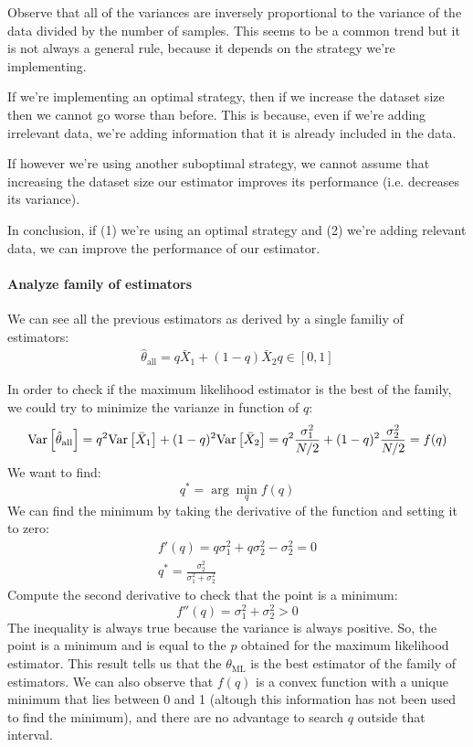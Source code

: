\begin{remark}
    Observe that all of the variances are inversely proportional to the variance of the data divided by the number of samples. This seems to be a common trend but it is not always a general rule, because it depends on the strategy we're implementing.

    If we're implementing an optimal strategy, then if we increase the dataset size then we cannot go worse than before. This is because, even if we're adding irrelevant data, we're adding information that it is already included in the data.

    If however we're using another suboptimal strategy, we cannot assume that increasing the dataset size our estimator improves its performance (i.e. decreases its variance).

    In conclusion, if (1) we're using an optimal strategy and (2) we're adding relevant data, we can improve the performance of our estimator.
\end{remark}
\paragraph*{Analyze family of estimators}
We can see all the previous estimators as derived by a single familiy of estimators:
\begin{gather*}
    \hat{\theta}_{\text{all}} = q\bar{X}_1 + (1-q) \bar{X}_2
    q\in[0,1]
\end{gather*}

In order to check if the maximum likelihood estimator is the best of the family, we could try to minimize the varianze in function of $q$:
\[
    \text{Var}\left[\hat{\theta}_{\text{all}}\right] = q^2\text{Var}\left[\bar{X}_1\right] + (1-q)^2\text{Var}\left[\bar{X}_2\right] = q^2\frac{\sigma_1^2}{N/2} + (1-q)^2\frac{\sigma_2^2}{N/2} = f(q)
\]
We want to find:
\[
    q^\ast = \arg\min_{q} f(q)
\]
We can find the minimum by taking the derivative of the function and setting it to zero:
\begin{gather*}
    f'(q) = q\sigma_1^2+q\sigma_2^2-\sigma_2^2 = 0 \\
    q^\ast = \frac{\sigma_2^2}{\sigma_1^2+\sigma_2^2}
\end{gather*}
Compute the second derivative to check that the point is a minimum:
\[
    f''(q) = \sigma_1^2+\sigma_2^2 > 0
\]
The inequality is always true because the variance is always positive. So, the point is a minimum and is equal to the $p$ obtained for the maximum likelihood estimator. This result tells us that the $\theta_{\text{ML}}$ is the best estimator of the family of estimators.
We can also observe that $f(q)$ is a convex function with a unique minimum that lies between 0 and 1 (altough this information has not been used to find the minimum), and there are no advantage to search $q$ outside that interval.
